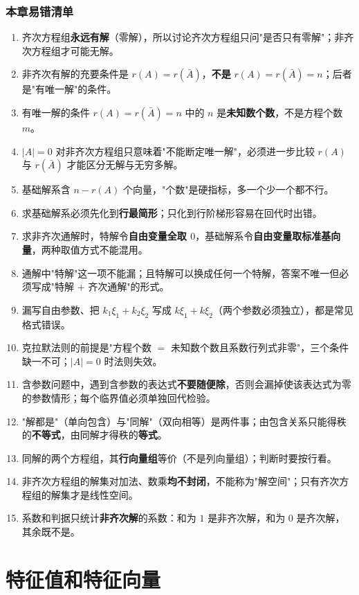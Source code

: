 \documentclass[11pt,openany,UTF8]{ctexbook}
\begin{document}
\subsection*{本章易错清单}

\begin{enumerate}
\item 齐次方程组\textbf{永远有解}（零解），所以讨论齐次方程组只问"是否只有零解"；非齐次方程组才可能无解。
\item 非齐次有解的充要条件是 $r(A)=r(\bar A)$，\textbf{不是} $r(A)=r(\bar A)=n$；后者是"有唯一解"的条件。
\item 有唯一解的条件 $r(A)=r(\bar A)=n$ 中的 $n$ 是\textbf{未知数个数}，不是方程个数 $m$。
\item $\vert A\vert=0$ 对非齐次方程组只意味着"不能断定唯一解"，必须进一步比较 $r(A)$ 与 $r(\bar A)$ 才能区分无解与无穷多解。
\item 基础解系含 $n-r(A)$ 个向量，"个数"是硬指标，多一个少一个都不行。
\item 求基础解系必须先化到\textbf{行最简形}；只化到行阶梯形容易在回代时出错。
\item 求非齐次通解时，特解令\textbf{自由变量全取 $0$}，基础解系令\textbf{自由变量取标准基向量}，两种取值方式不能混用。
\item 通解中"特解"这一项不能漏；且特解可以换成任何一个特解，答案不唯一但必须写成"特解 $+$ 齐次通解"的形式。
\item 漏写自由参数、把 $k_1\xi_1+k_2\xi_2$ 写成 $k\xi_1+k\xi_2$（两个参数必须独立），都是常见格式错误。
\item 克拉默法则的前提是"方程个数 $=$ 未知数个数且系数行列式非零"，三个条件缺一不可；$\vert A\vert=0$ 时法则失效。
\item 含参数问题中，遇到含参数的表达式\textbf{不要随便除}，否则会漏掉使该表达式为零的参数情形；每个临界值必须单独回代检验。
\item "解都是"（单向包含）与"同解"（双向相等）是两件事；由包含关系只能得秩的\textbf{不等式}，由同解才得秩的\textbf{等式}。
\item 同解的两个方程组，其\textbf{行向量组}等价（不是列向量组）；判断时要按行看。
\item 非齐次方程组的解集对加法、数乘\textbf{均不封闭}，不能称为"解空间"；只有齐次方程组的解集才是线性空间。
\item 系数和判据只统计\textbf{非齐次解}的系数：和为 $1$ 是非齐次解，和为 $0$ 是齐次解，其余既不是。
\end{enumerate}
\chapter{特征值和特征向量}
\end{document}
